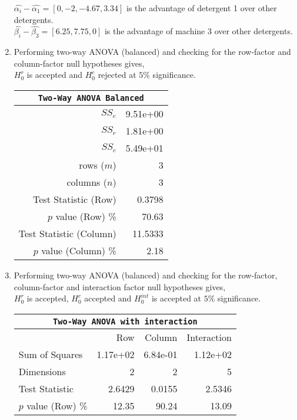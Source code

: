 \begin{enumerate}
	$ \widehat{\alpha_i} - \widehat{\alpha_1} = [ 0, -2, -4.67, 3.34 ] $ is the advantage of detergent 1 over other detergents.\\
	$ \widehat{\beta_i} - \widehat{\beta_3} = [6.25, 7.75, 0  ] $ is the advantage of machine 3 over other detergents.\\
	
	\item Performing two-way ANOVA (balanced) and checking for the row-factor and column-factor null hypotheses gives,\\
	$ H_0^r $ is accepted and $ H_0^c $ rejected at $ 5\% $ significance.\\
	
	\begin{table}[H]
		\centering
		\begin{tabular}{@{}rr@{}}
			\toprule
			\multicolumn{2}{c}{\texttt{Two-Way ANOVA Balanced}} \\
			\midrule
			$SS_e$                  &               9.51e+00 \\
			$SS_r$                  &               1.81e+00 \\
			$SS_c$                  &               5.49e+01 \\
			rows ($m$)              &                      3 \\
			columns ($n$)           &                      3 \\
			Test Statistic (Row)    &                 0.3798 \\
			$p$ value (Row) \%      &                  70.63 \\
			Test Statistic (Column) &                11.5333 \\
			$p$ value (Column) \%   &                   2.18 \\
			\bottomrule
		\end{tabular}
		
		\bigskip
	\end{table}

	
	\item Performing two-way ANOVA (balanced) and checking for the row-factor, column-factor and interaction factor null hypotheses gives,\\
	$ H_0^r $ is accepted, $ H_0^c $ accepted and $ H_0^{int} $ is accepted at $ 5\% $ significance.\\
	
	\begin{table}[H]
		\centering
		\begin{tabular}{@{}lrrr@{}}
			\toprule
			\multicolumn{4}{c}{\texttt{Two-Way ANOVA with interaction}}\\ 
			\midrule
			{} &       Row &    Column & Interaction \\
			\midrule
			Sum of Squares     &  1.17e+02 &  6.84e-01 &    1.12e+02 \\
			Dimensions         &         2 &         2 &           5 \\
			Test Statistic     &    2.6429 &    0.0155 &      2.5346 \\
			$p$ value (Row) \% &     12.35 &     90.24 &       13.09 \\
			\bottomrule
		\end{tabular}
		

\end{table}
\end{enumerate}
